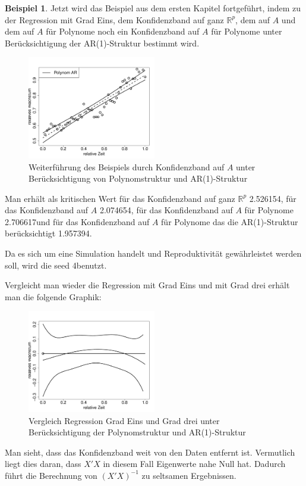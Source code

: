 \documentclass[12pt,a4paper]{article}
\theoremstyle{definition}
\newtheorem{Beispiel}[Definition]{Beispiel}
\theoremstyle{definition}
\theoremstyle{definition}
\theoremstyle{definition}
\newcommand{\cR}{2.526154}
\newcommand{\seedsimulation}{4}
\newcommand{\cA}{2.074654}
\newcommand{\cAP}{2.706617}
\newcommand{\cAPAR}{1.957394}
\begin{document}
\begin{Beispiel}
Jetzt wird das Beispiel aus dem ersten Kapitel fortgeführt, indem zu der Regression mit Grad Eins, dem Konfidenzband auf ganz $\mathbb{R}^{p}$, dem auf $A$ und dem auf $A$ für Polynome noch ein Konfidenzband auf $A$ für Polynome unter Berücksichtigung der AR(1)-Struktur bestimmt wird.

\begin{figure}[H] 
  \centering
     \includegraphics[width=0.5\textwidth]{Bsp-KB-poly-AR}
  \caption{Weiterführung des Beispiels durch Konfidenzband auf $A$ unter Berücksichtigung von Polynomstruktur und AR(1)-Struktur}
  \label{Bsp-KB-poly-AR}
\end{figure}

Man erhält als kritischen Wert für das Konfidenzband auf ganz $\mathbb{R}^{p}$ \cR , für das Konfidenzband auf $A$ \cA, für das Konfidenzband auf $A$ für Polynome \cAP und für das Konfidenzband auf $A$ für Polynome das die AR(1)-Struktur berücksichtigt \cAPAR . 

Da es sich um eine Simulation handelt und Reproduktivität gewährleistet werden soll, wird die seed \seedsimulation benutzt. 

Vergleicht man wieder die Regression mit Grad Eins und mit Grad drei erhält man die folgende Graphik:

\begin{figure}[H] 
  \centering
     \includegraphics[width=0.5\textwidth]{Bsp-KB-poly-hetero-AR}
  \caption{Vergleich Regression Grad Eins und Grad drei unter Berücksichtigung der Polynomstruktur und AR(1)-Struktur}
  \label{Bsp-KB-poly-hetero-AR}
\end{figure}

Man sieht, dass das Konfidenzband weit von den Daten entfernt ist. Vermutlich liegt dies daran, dass $X'X$ in diesem Fall Eigenwerte nahe Null hat. Dadurch führt die Berechnung von $(X'X)^{-1}$ zu seltsamen Ergebnissen.

\end{Beispiel}
\end{document}
